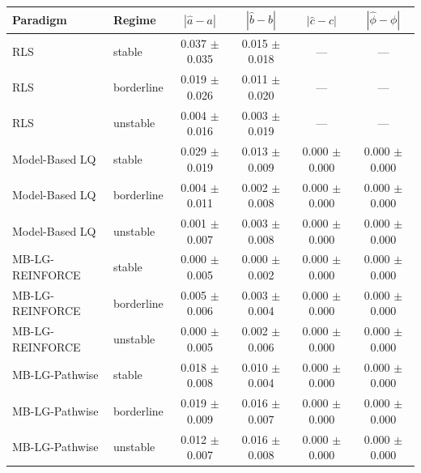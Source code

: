 \begin{tabular}{@{}llcccc@{}}
\toprule
Paradigm & Regime & $|\hat a - a|$ & $|\hat b - b|$ & $|\hat c - c|$ & $|\hat\phi - \phi|$ \\
\midrule
RLS & stable & 0.037 $\pm$ 0.035 & 0.015 $\pm$ 0.018 & --- & --- \\
RLS & borderline & 0.019 $\pm$ 0.026 & 0.011 $\pm$ 0.020 & --- & --- \\
RLS & unstable & 0.004 $\pm$ 0.016 & 0.003 $\pm$ 0.019 & --- & --- \\
\midrule
Model-Based LQ & stable & 0.029 $\pm$ 0.019 & 0.013 $\pm$ 0.009 & 0.000 $\pm$ 0.000 & 0.000 $\pm$ 0.000 \\
Model-Based LQ & borderline & 0.004 $\pm$ 0.011 & 0.002 $\pm$ 0.008 & 0.000 $\pm$ 0.000 & 0.000 $\pm$ 0.000 \\
Model-Based LQ & unstable & 0.001 $\pm$ 0.007 & 0.003 $\pm$ 0.008 & 0.000 $\pm$ 0.000 & 0.000 $\pm$ 0.000 \\
\midrule
MB-LG-REINFORCE & stable & 0.000 $\pm$ 0.005 & 0.000 $\pm$ 0.002 & 0.000 $\pm$ 0.000 & 0.000 $\pm$ 0.000 \\
MB-LG-REINFORCE & borderline & 0.005 $\pm$ 0.006 & 0.003 $\pm$ 0.004 & 0.000 $\pm$ 0.000 & 0.000 $\pm$ 0.000 \\
MB-LG-REINFORCE & unstable & 0.000 $\pm$ 0.005 & 0.002 $\pm$ 0.006 & 0.000 $\pm$ 0.000 & 0.000 $\pm$ 0.000 \\
\midrule
MB-LG-Pathwise & stable & 0.018 $\pm$ 0.008 & 0.010 $\pm$ 0.004 & 0.000 $\pm$ 0.000 & 0.000 $\pm$ 0.000 \\
MB-LG-Pathwise & borderline & 0.019 $\pm$ 0.009 & 0.016 $\pm$ 0.007 & 0.000 $\pm$ 0.000 & 0.000 $\pm$ 0.000 \\
MB-LG-Pathwise & unstable & 0.012 $\pm$ 0.007 & 0.016 $\pm$ 0.008 & 0.000 $\pm$ 0.000 & 0.000 $\pm$ 0.000 \\
\midrule
\bottomrule
\end{tabular}
